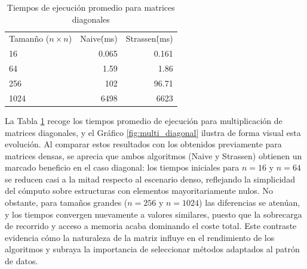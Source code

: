 \begin{table}[ht]
  \centering
  \begin{tabular}{lrr}

    Tamanño ($n \times n$)  & Naive\.(ms) & Strassen\.(ms)\\

    16  & 0.065 & 0.161  \\
    64  & 1.59  & 1.86\\
    256& 102& 96.71\\
    1024& 6498 &  6623\\

  \end{tabular}
  \caption{Tiempos de ejecución promedio para matrices diagonales}
  \label{tab:sorting-results5}
\end{table}

La Tabla \ref{tab:sorting-results5} recoge los tiempos promedio de ejecución para multiplicación de matrices diagonales, y el Gráfico \ref{fig:multi_diagonal} ilustra de forma visual esta evolución. Al comparar estos resultados con los obtenidos previamente para matrices densas, se aprecia que ambos algoritmos (Naive y Strassen) obtienen un marcado beneficio en el caso diagonal: los tiempos iniciales para \(n=16\) y \(n=64\) se reducen casi a la mitad respecto al escenario denso, reflejando la simplicidad del cómputo sobre estructuras con elementos mayoritariamente nulos. No obstante, para tamaños grandes (\(n=256\) y \(n=1024\)) las diferencias se atenúan, y los tiempos convergen nuevamente a valores similares, puesto que la sobrecarga de recorrido y acceso a memoria acaba dominando el coste total. Este contraste evidencia cómo la naturaleza de la matriz influye en el rendimiento de los algoritmos y subraya la importancia de seleccionar métodos adaptados al patrón de datos.

